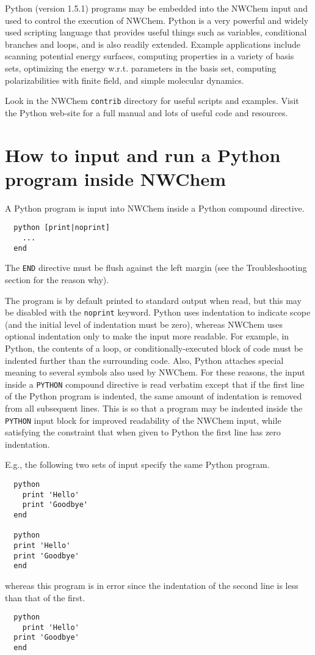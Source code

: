 \label{sec:python}

Python (version 1.5.1) programs may be embedded into the NWChem input
and used to control the execution of NWChem.  Python is a very
powerful and widely used scripting language that provides useful
things such as variables, conditional branches and loops, and is also
readily extended.  Example applications include scanning potential
energy surfaces, computing properties in a variety of basis sets,
optimizing the energy w.r.t. parameters in the basis set, computing
polarizabilities with finite field, and simple molecular dynamics.

Look in the NWChem \verb+contrib+ directory for useful scripts and
examples. Visit the Python web-site 
for a full manual and lots of useful code and resources.  

\section{How to input and run a Python program inside NWChem}

A Python program is input into NWChem inside a Python compound directive.
\begin{verbatim}
  python [print|noprint]
    ...
  end
\end{verbatim}
The \verb+END+ directive must be flush against the left
margin (see the Troubleshooting section for the reason why).

The program is by default printed to standard output when read, but
this may be disabled with the \verb+noprint+ keyword.  Python uses
indentation to indicate scope (and the initial level of indentation
must be zero), whereas NWChem uses optional indentation only to make
the input more readable.  For example, in Python, the contents of a
loop, or conditionally-executed block of code must be indented further
than the surrounding code.  Also, Python attaches special meaning to
several symbols also used by NWChem.  For these reasons, the input
inside a \verb+PYTHON+ compound directive is read verbatim except that
if the first line of the Python program is indented, the same amount
of indentation is removed from all subsequent lines.  This is so that
a program may be indented inside the \verb+PYTHON+ input block for
improved readability of the NWChem input, while satisfying the
constraint that when given to Python the first line has zero
indentation.

E.g., the following two sets of input specify the same Python program.
\begin{verbatim}
  python
    print 'Hello'
    print 'Goodbye'
  end

  python
  print 'Hello'
  print 'Goodbye'
  end
\end{verbatim}
whereas this program is in error since the indentation of the second
line is less than that of the first.
\begin{verbatim}
  python
    print 'Hello'
  print 'Goodbye'
  end
\end{verbatim}

